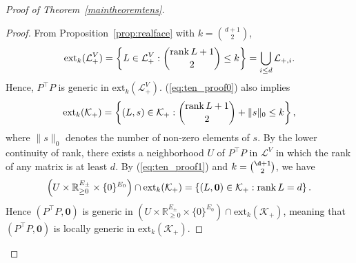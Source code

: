 \documentclass[11pt]{article}
\theoremstyle{definition}
\begin{document}
\begin{proof}[Proof of Theorem~\ref{maintheoremtens}]
\begin{proof}
        From Proposition~\ref{prop:realface} with $k=\binom{d+1}{2}$, 
        \begin{equation}\label{eq:ten_proof0}
        \text{ext}_k(\mathcal{L}_+^V)=\left\{L\in \mathcal{L}^V_+:\binom{\rank L+1}{2} \leq k \right\}=\bigcup_{i\leq d} \mathcal{L}_{+,i}.
        \end{equation}
        Hence,  $P^\top P$ is generic in  $\text{ext}_k(\mathcal{L}_+^V)$.
        (\ref{eq:ten_proof0}) also implies 
        \begin{equation}\label{eq:ten_proof1}
        \text{ext}_k(\mathcal{K}_+) = \left\{ (L,s) \in \mathcal{K}_+ : \binom{\rank  L+1}{2} + \|s\|_0  \leq k \right\},
        \end{equation}
        where $\|s\|_0$ denotes the number of non-zero elements of $s$.
        By the lower continuity of rank, 
        there exists a neighborhood $U$ of $P^{\top}P$ in $\mathcal{L}^V$ in which the rank of any matrix is at least $d$.
   By (\ref{eq:ten_proof1}) and $k={\d+1 \choose 2}$, we have
   \[
   \left(U \times \mathbb{R}_{\geq 0}^{E_\pm} \times \{0\}^{E_0} \right)\cap \text{ext}_k(\mathcal{K}_+) = \left\{ (L,\bm{0}) \in \mathcal{K}_+ : \rank L =d \right\}.
   \]
%        
Hence $(P^\top P, {\bm 0})$ is generic in $\left(U \times \mathbb{R}_{\geq 0}^{E_\pm} \times \{0\}^{E_0} \right)\cap \text{ext}_k(\mathcal{K}_+)$, meaning that $(P^\top P, {\bm 0})$ is locally generic in $\text{ext}_k(\mathcal{K}_+)$.
    \end{proof}




\end{proof}
\end{document}
